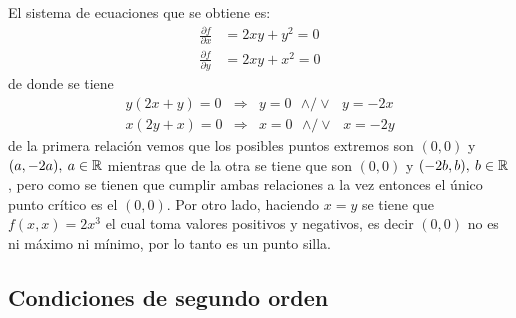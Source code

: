 \begin{solucion}
El sistema de ecuaciones que se obtiene es:
\begin{align*}
\frac{\partial f}{\partial x}  & =2xy+y^{2} =0 \\
\frac{\partial f}{\partial y}  & =2xy+x^{2} =0
\end{align*}
de donde se tiene
\begin{eqnarray*}
y(2x+y) = 0 & \Rightarrow& y=0 \text{ $\wedge/\vee$ } y=-2x \\
x(2y+x) = 0 & \Rightarrow& x=0 \text{ $\wedge/\vee$ } x=-2y
\end{eqnarray*}
de la primera relaci\'on vemos que los posibles puntos extremos son $(0,0)$
y $(a,-2a),\:a\in\mathbb{R}$ mientras que de la otra se tiene que son $(0,0)$ y
$(-2b,b),\:b\in\mathbb{R}$, pero como se tienen que cumplir ambas relaciones a la vez
entonces el \'unico punto cr\'itico es el $(0,0)$. Por otro lado, haciendo
$x=y$ se tiene que $f(x,x)=2x^{3}$ el cual toma valores positivos y negativos,
es decir $(0,0)$ no es ni m\'aximo ni m\'inimo, por lo tanto es un punto silla.
\end{solucion}

\subsection{Condiciones de segundo orden}

